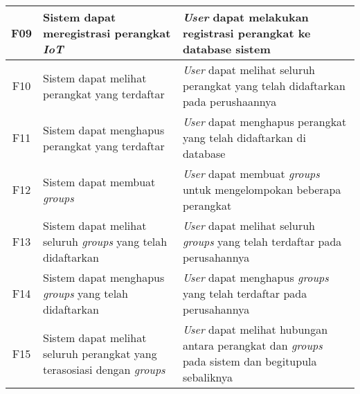 \begin{table}[ht]
\begin{tabular}{|c|p{4.5cm}|p{8cm}|}
    \hline
    F09 & Sistem dapat meregistrasi perangkat \textit{IoT}                               & \textit{User} dapat melakukan registrasi perangkat ke database sistem                                           \\
    \hline
    F10 & Sistem dapat melihat perangkat yang terdaftar                                  & \textit{User} dapat melihat seluruh perangkat yang telah didaftarkan pada perushaannya                          \\
    \hline
    F11 & Sistem dapat menghapus perangkat yang terdaftar                                & \textit{User} dapat menghapus perangkat yang telah didaftarkan di database                                      \\
    \hline
    F12 & Sistem dapat membuat \textit{groups}                                           & \textit{User} dapat membuat \textit{groups} untuk mengelompokan beberapa perangkat                              \\
    \hline
    F13 & Sistem dapat melihat seluruh \textit{groups} yang telah didaftarkan            & \textit{User} dapat melihat seluruh \textit{groups} yang telah terdaftar pada perusahannya                      \\
    \hline
    F14 & Sistem dapat menghapus \textit{groups} yang telah didaftarkan                  & \textit{User} dapat menghapus \textit{groups} yang telah terdaftar pada perusahannya                            \\
    \hline
    F15 & Sistem dapat melihat seluruh perangkat yang terasosiasi dengan \textit{groups} & \textit{User} dapat melihat hubungan antara perangkat dan \textit{groups} pada sistem dan begitupula sebaliknya \\
    \hline
  \end{tabular}
\end{table}
\egroup

\pagebreak

